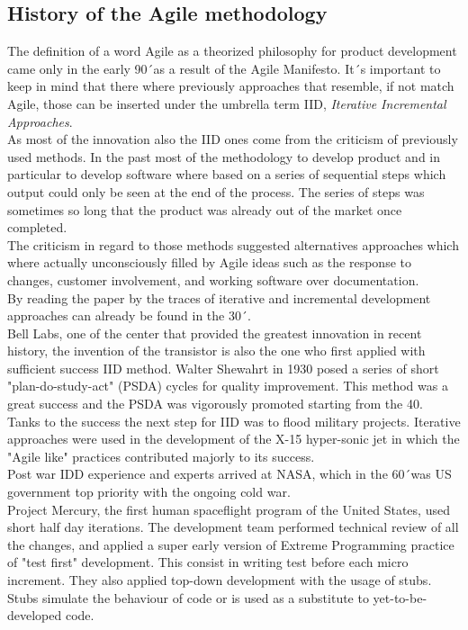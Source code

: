 \documentclass[../main.tex]{subfiles}
\begin{document}
\subsection{History of the Agile methodology}
The definition of a word Agile as a theorized philosophy for product development came only in the early 90´as a result of the Agile Manifesto. It´s important to keep in mind that there where previously approaches that resemble, if not match Agile, those can be inserted under the umbrella term IID, \textit{Iterative Incremental Approaches}.\\
As most of the innovation also the IID ones come from the criticism of previously used methods. In the past most of the methodology to develop product and in particular to develop software where based on a series of sequential steps which output could only be seen at the end of the process. The series of steps was sometimes so long that the product was already out of the market once completed.\\
The criticism in regard to those methods suggested alternatives approaches which where actually unconsciously filled by Agile ideas such as the response to changes, customer involvement, and working software over documentation.\\
By reading the paper by \citet{larman2003iterative} the traces of iterative and incremental development approaches can already be found in the 30´. \\
Bell Labs, one of the center that provided the greatest innovation in recent history, the invention of the transistor is also the one who first applied with sufficient success IID method. Walter Shewahrt in 1930 posed a series of short "plan-do-study-act" (PSDA) cycles for quality improvement. This method was a great success and the PSDA was vigorously promoted starting from the 40.\\ 
Tanks to the success the next step for IID was to flood military projects. Iterative approaches were used in the development of the X-15 hyper-sonic jet in which the "Agile like" practices contributed majorly to its success.\\ Post war IDD experience and experts arrived at NASA, which in the 60´was US government top priority with the ongoing cold war.\\
Project Mercury, the first human spaceflight program of the United States, used short half day iterations. The development team performed technical review of all the changes, and applied a super early version of Extreme Programming practice of "test first" development. This consist in writing test before each micro increment. They also applied top-down development with the usage of stubs. Stubs simulate the behaviour of code or is used as a substitute to yet-to-be-developed code.\\ 
\end{document}
